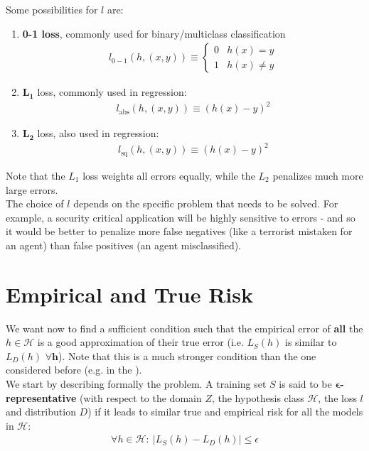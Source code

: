 \documentclass[../template.tex]{subfiles}
\begin{document}
Some possibilities for $l$ are:
\begin{enumerate}
    \item \textbf{0-1 loss}, commonly used for binary/multiclass classification
    \begin{align*}
        l_{0-1}(h, (x,y)) \equiv \begin{cases}
            0 & h(x) = y\\
            1 & h(x) \neq y
        \end{cases}
    \end{align*} 
    \item $\bm{L_1}$ loss, commonly used in regression:
    \begin{align*}
        l_{\mathrm{abs} }(h, (x,y)) \equiv (h(x) - y)^2    
    \end{align*}   
    \item $\bm{L_2}$ loss, also used in regression:
    \begin{align*}
        l_{\mathrm{sq}}(h, (x, y)) \equiv (h(x)-y)^2
    \end{align*} 
\end{enumerate}
Note that the $L_1$ loss weights all errors equally, while the $L_2$ penalizes much more large errors.\\
The choice of $l$ depends on the specific problem that needs to be solved. For example, a security critical application will be highly sensitive to errors - and so it would be better to penalize more false negatives (like a terrorist mistaken for an agent) than false positives (an agent misclassified).

\section{Empirical and True Risk}
We want now to find a sufficient condition such that the empirical error of \textbf{all} the $h \in \mathcal{H}$ is a good approximation of their true error (i.e. $L_S(h)$ is similar to $L_D(h)$ $\bm{\forall h}$). Note that this is a much stronger condition than the one considered before (e.g. in the ).\\

We start by describing formally the problem. A training set $S$ is said to be $\bm{\epsilon}$\textbf{-representative} (with respect to the domain $Z$, the hypothesis class $\mathcal{H}$, the loss $l$ and distribution $D$) if it leads to similar true and empirical risk for all the models in $\mathcal{H}$:
\begin{align*}
    \forall h \in \mathcal{H}\colon \> |L_S(h) - L_D(h)| \leq \epsilon
\end{align*}     
\end{document}
